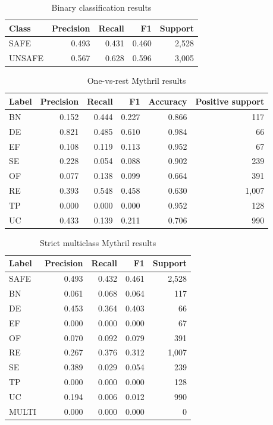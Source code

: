 \documentclass[a4paper,11pt]{article}\usepackage{graphicx} %
\begin{document}
\begin{table}[htbp]
\centering
\caption{Binary classification results}
\label{tab:mythril_binary}
\begin{tabular}{lrrrr}
\hline
Class & Precision & Recall & F1 & Support \\
\hline
SAFE & 0.493 & 0.431 & 0.460 & 2{,}528 \\
UNSAFE & 0.567 & 0.628 & 0.596 & 3{,}005 \\
\hline
\end{tabular}
\end{table}

\begin{table}[htbp]
\centering
\caption{One-vs-rest Mythril results}
\label{tab:mythril_ovr}
\begin{tabular}{lrrrrr}
\hline
Label & Precision & Recall & F1 & Accuracy & Positive support \\
\hline
BN & 0.152 & 0.444 & 0.227 & 0.866 & 117 \\
DE & 0.821 & 0.485 & 0.610 & 0.984 & 66 \\
EF & 0.108 & 0.119 & 0.113 & 0.952 & 67 \\
SE & 0.228 & 0.054 & 0.088 & 0.902 & 239 \\
OF & 0.077 & 0.138 & 0.099 & 0.664 & 391 \\
RE & 0.393 & 0.548 & 0.458 & 0.630 & 1{,}007 \\
TP & 0.000 & 0.000 & 0.000 & 0.952 & 128 \\
UC & 0.433 & 0.139 & 0.211 & 0.706 & 990 \\
\hline
\end{tabular}
\end{table}

\begin{table}[htbp]
\centering
\caption{Strict multiclass Mythril results}
\label{tab:mythril_multiclass}
\begin{tabular}{lrrrr}
\hline
Label & Precision & Recall & F1 & Support \\
\hline
SAFE & 0.493 & 0.432 & 0.461 & 2{,}528 \\
BN & 0.061 & 0.068 & 0.064 & 117 \\
DE & 0.453 & 0.364 & 0.403 & 66 \\
EF & 0.000 & 0.000 & 0.000 & 67 \\
OF & 0.070 & 0.092 & 0.079 & 391 \\
RE & 0.267 & 0.376 & 0.312 & 1{,}007 \\
SE & 0.389 & 0.029 & 0.054 & 239 \\
TP & 0.000 & 0.000 & 0.000 & 128 \\
UC & 0.194 & 0.006 & 0.012 & 990 \\
MULTI & 0.000 & 0.000 & 0.000 & 0 \\
\hline
\end{tabular}
\end{table}
\end{document}
